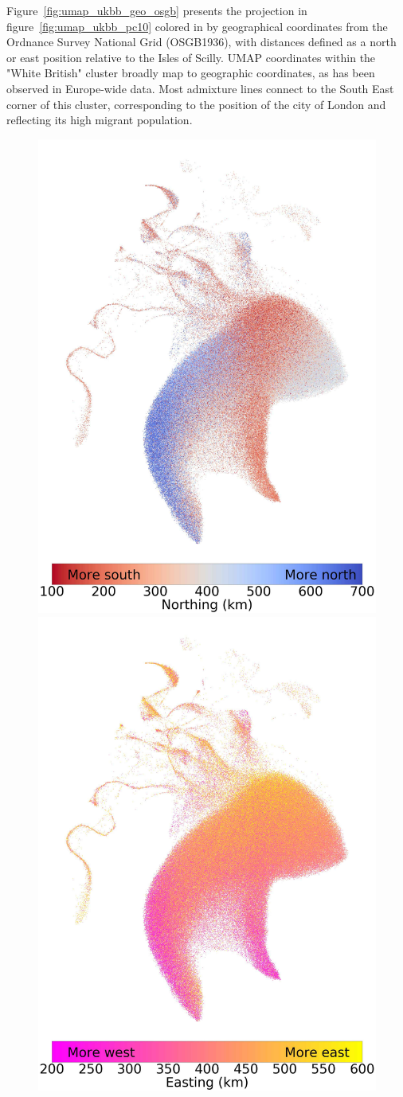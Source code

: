 \documentclass[12pt]{pnas-new}
\begin{document}
Figure~\ref{fig:umap_ukbb_geo_osgb} presents the projection in figure~\ref{fig:umap_ukbb_pc10} colored in by  geographical coordinates from the Ordnance Survey National Grid (OSGB1936), with distances defined as a north or east position relative to the Isles of Scilly. UMAP coordinates within the "White British" cluster broadly map to geographic coordinates, as has been observed in Europe-wide data\cite{novembre2008europe}. Most admixture lines connect to the South East corner of this cluster, corresponding to the position of the city of London and reflecting its high migrant population.  

\begin{figure}
    \centering
    \includegraphics[width=0.49\columnwidth]{images/UKBB_UMAP_PC10_NN15_MD05_2018328174511_ns_permuted_10nn_sd50000_base50000_201883118582.pdf}
    \includegraphics[width=.49\columnwidth]{images/UKBB_UMAP_PC10_NN15_MD05_2018328174511_ew_permuted_10nn_sd50000_base50000_201883118582.pdf}

\end{figure}
\end{document}
